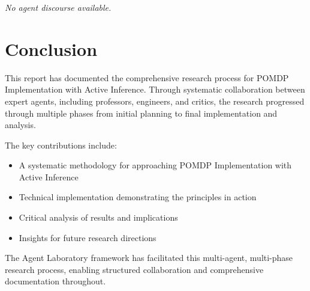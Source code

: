 \documentclass[11pt,a4paper]{article}
\begin{document}
\textit{No agent discourse available.}


\section{Conclusion}

This report has documented the comprehensive research process for POMDP Implementation with Active Inference. Through systematic collaboration between expert agents, including professors, engineers, and critics, the research progressed through multiple phases from initial planning to final implementation and analysis.

The key contributions include:
\begin{itemize}
    \item A systematic methodology for approaching POMDP Implementation with Active Inference
    \item Technical implementation demonstrating the principles in action
    \item Critical analysis of results and implications
    \item Insights for future research directions
\end{itemize}

The Agent Laboratory framework has facilitated this multi-agent, multi-phase research process, enabling structured collaboration and comprehensive documentation throughout.
\end{document}
